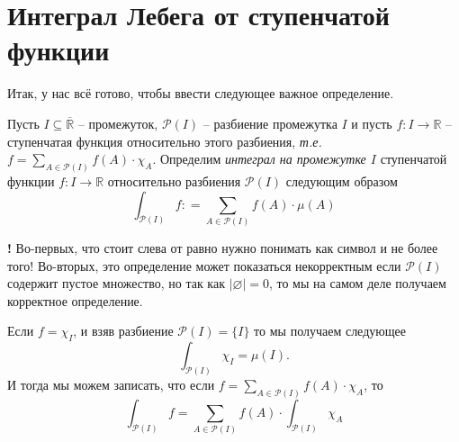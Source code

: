 \section{Интеграл Лебега от ступенчатой функции}

Итак, у нас всё готово, чтобы ввести следующее важное определение.

\begin{definition}\label{int_of_p.c_on_I}
    Пусть $I \subseteq \overline{\mathbb{R}}$ -- промежуток, $\mathscr{P}(I)$ -- разбиение промежутка $I$ и пусть $f:I \to \mathbb{R}$ -- ступенчатая функция относительно этого разбиения, \textit{т.е.} $f = \sum_{A \in \mathscr{P}(I)}f(A) \cdot \chi_A$. Определим \textit{интеграл на промежутке $I$} ступенчатой функции $f:I \to \mathbb{R}$ относительно разбиения $\mathscr{P}(I)$ следующим образом
    \[
     \int_{\mathscr{P}(I)}f: =  \sum_{A \in \mathscr{P}(I)} f(A)\cdot \mu(A)
    \]
\end{definition}

\begin{mydanger}{\bf !}
     Во-первых, что стоит слева от равно нужно понимать как символ и не более того! Во-вторых, это определение может показаться некорректным если $\mathscr{P}(I)$ содержит пустое множество, но так как $|\varnothing| = 0$, то мы на самом деле получаем корректное определение.     
\end{mydanger}

\begin{remark}\label{int_via_chi}
    Если $f = \chi_I$, и взяв разбиение $\mathscr{P}(I) = \{I\}$ то мы получаем следующее
    \[
     \int_{\mathscr{P}(I)}\chi_I = \mu(I).
    \]
И тогда мы можем записать, что если $f = \sum_{A \in \mathscr{P}(I)}f(A) \cdot \chi_A$, то
\[
\boxed{
 \int_{\mathscr{P}(I)}f = \sum_{A \in \mathscr{P}(I)} f(A) \cdot \int_{\mathscr{P}(I)}\chi_A
 }
\]
\end{remark}


